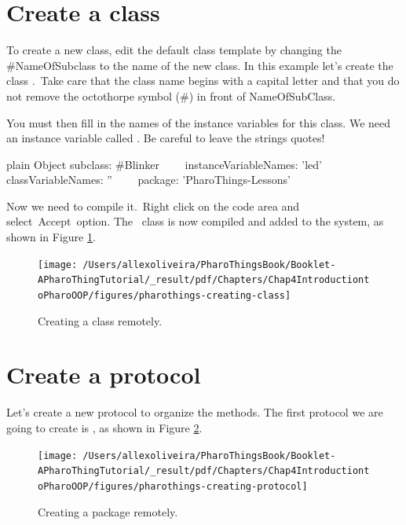 \documentclass[10pt,twoside,english]{_support/latex/sbabook/sbabook}
\begin{document}
\section{Create a class}
To create a new class, edit the default class template by changing the \#NameOfSubclass to the name of the new class. In this example let's create the class . Take care that the class name begins with a capital letter and that you do not remove the octothorpe symbol (\#) in front of NameOfSubClass. 

You must then fill in the names of the instance variables for this class. We need an instance variable called . Be careful to leave the strings quotes!

\begin{displaycode}{plain}
Object subclass: #Blinker
  instanceVariableNames: 'led'
  classVariableNames: ''
  package: 'PharoThings-Lessons'
\end{displaycode}

Now we need to compile it. Right click on the code area and select Accept option. The  class is now compiled and added to the system, as shown in Figure \ref{CreatingClass}.


\begin{figure}

\begin{center}
\texttt{[image: /Users/allexoliveira/PharoThingsBook/Booklet-APharoThingTutorial/\_result/pdf/Chapters/Chap4IntroductiontoPharoOOP/figures/pharothings-creating-class]}\caption{Creating a class remotely.\label{CreatingClass}}\end{center}
\end{figure}

\section{Create a protocol}
Let's create a new protocol to organize the methods. The first protocol we are going to create is , as shown in Figure \ref{CreatingProtocol}.


\begin{figure}

\begin{center}
\texttt{[image: /Users/allexoliveira/PharoThingsBook/Booklet-APharoThingTutorial/\_result/pdf/Chapters/Chap4IntroductiontoPharoOOP/figures/pharothings-creating-protocol]}\caption{Creating a package remotely.\label{CreatingProtocol}}\end{center}
\end{figure}
\end{document}
